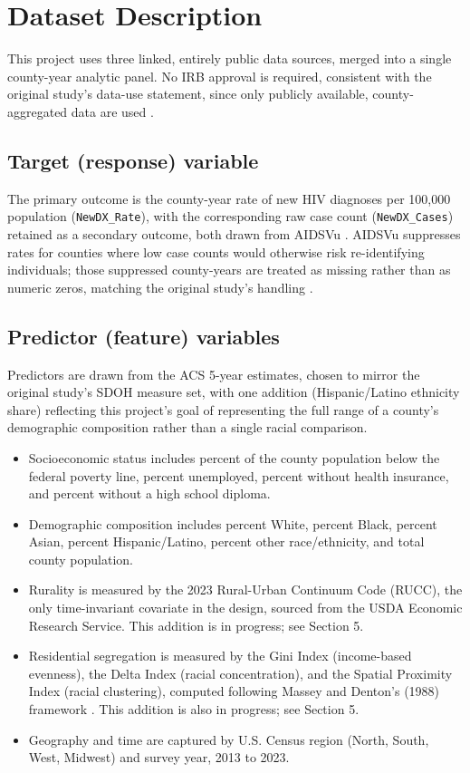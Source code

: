 \documentclass[11pt,letterpaper]{article}
\begin{document}
\section{Dataset Description}

This project uses three linked, entirely public data sources, merged into a single county-year analytic panel. No IRB approval is required, consistent with the original study's data-use statement, since only publicly available, county-aggregated data are used \cite{garrett2026}.

\subsection{Target (response) variable}
The primary outcome is the county-year rate of new HIV diagnoses per 100,000 population (\texttt{NewDX\_Rate}), with the corresponding raw case count (\texttt{NewDX\_Cases}) retained as a secondary outcome, both drawn from AIDSVu \cite{aidsvu_resources, aidsvu_methods}. AIDSVu suppresses rates for counties where low case counts would otherwise risk re-identifying individuals; those suppressed county-years are treated as missing rather than as numeric zeros, matching the original study's handling \cite{garrett2026}.

\subsection{Predictor (feature) variables}
Predictors are drawn from the ACS 5-year estimates, chosen to mirror the original study's SDOH measure set, with one addition (Hispanic/Latino ethnicity share) reflecting this project's goal of representing the full range of a county's demographic composition rather than a single racial comparison.
\begin{itemize}[leftmargin=1.4em]
  \item Socioeconomic status includes percent of the county population below the federal poverty line, percent unemployed, percent without health insurance, and percent without a high school diploma.
  \item Demographic composition includes percent White, percent Black, percent Asian, percent Hispanic/Latino, percent other race/ethnicity, and total county population.
  \item Rurality is measured by the 2023 Rural-Urban Continuum Code (RUCC), the only time-invariant covariate in the design, sourced from the USDA Economic Research Service. This addition is in progress; see Section 5.
  \item Residential segregation is measured by the Gini Index (income-based evenness), the Delta Index (racial concentration), and the Spatial Proximity Index (racial clustering), computed following Massey and Denton's (1988) framework \cite{massey1988}. This addition is also in progress; see Section 5.
  \item Geography and time are captured by U.S. Census region (North, South, West, Midwest) \cite{census_regions} and survey year, 2013 to 2023.
\end{itemize}
\end{document}
